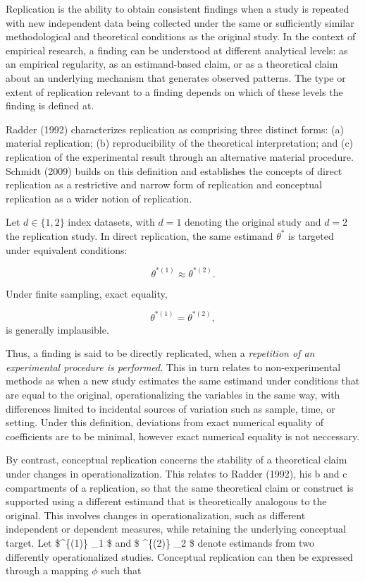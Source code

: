 \documentclass[
  12pt,
  letterpaper,
  man]{apa7}
\begin{document}
Replication is the ability to obtain consistent findings when a study is
repeated with new independent data being collected under the same or
sufficiently similar methodological and theoretical conditions as the
original study. In the context of empirical research, a finding can be
understood at different analytical levels: as an empirical regularity,
as an estimand-based claim, or as a theoretical claim about an
underlying mechanism that generates observed patterns. The type or
extent of replication relevant to a finding depends on which of these
levels the finding is defined at.

Radder (1992) characterizes replication as comprising three distinct
forms: (a) material replication; (b) reproducibility of the theoretical
interpretation; and (c) replication of the experimental result through
an alternative material procedure. Schmidt (2009) builds on this
definition and establishes the concepts of direct replication as a
restrictive and narrow form of replication and conceptual replication as
a wider notion of replication.

Let \(d \in \{1,2\}\) index datasets, with \(d = 1\) denoting the
original study and \(d = 2\) the replication study. In direct
replication, the same estimand \(\theta^*\) is targeted under equivalent
conditions:

\[\theta^{*(1)} \approx \theta^{*(2)}. \]

Under finite sampling, exact equality,

\[\theta^{*(1)} =\theta^{*(2)}, \] is generally implausible.

Thus, a finding is said to be directly replicated, when a
\emph{repetition of an experimental procedure is performed}. This in
turn relates to non-experimental methods as when a new study estimates
the same estimand under conditions that are equal to the original,
operationalizing the variables in the same way, with differences limited
to incidental sources of variation such as sample, time, or setting.
Under this definition, deviations from exact numerical equality of
coefficients are to be minimal, however exact numerical equality is not
neccessary.

By contrast, conceptual replication concerns the stability of a
theoretical claim under changes in operationalization. This relates to
Radder (1992), his b and c compartments of a replication, so that the
same theoretical claim or construct is supported using a different
estimand that is theoretically analogous to the original. This involves
changes in operationalization, such as different independent or
dependent measures, while retaining the underlying conceptual target.
Let \$\theta\^{}\{(1)\} \in \Theta\_1 \$ and \$ \theta\^{}\{(2)\}
\in \Theta\_2 \$ denote estimands from two differently operationalized
studies. Conceptual replication can then be expressed through a mapping
\(\phi\) such that
\end{document}

